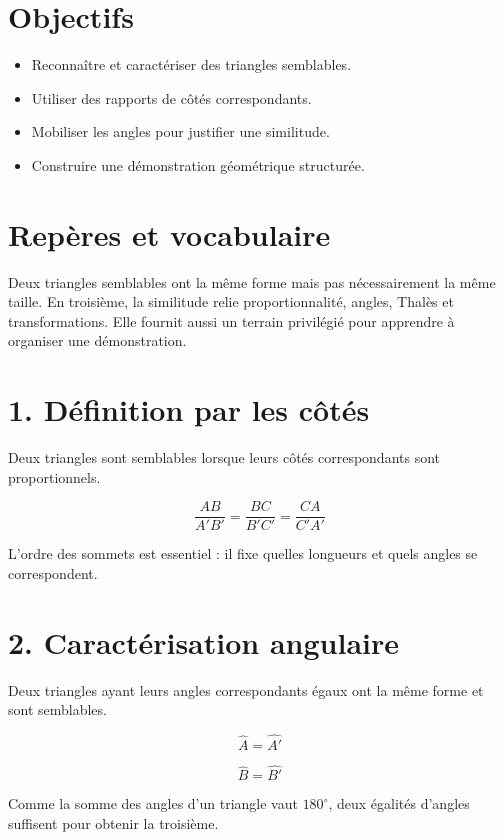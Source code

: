 
\section{Objectifs}
\begin{itemize}
\item Reconnaître et caractériser des triangles semblables.
\item Utiliser des rapports de côtés correspondants.
\item Mobiliser les angles pour justifier une similitude.
\item Construire une démonstration géométrique structurée.
\end{itemize}

\section{Repères et vocabulaire}
Deux triangles semblables ont la même forme mais pas nécessairement la même taille. En troisième, la similitude relie proportionnalité, angles, Thalès et transformations. Elle fournit aussi un terrain privilégié pour apprendre à organiser une démonstration.

\section{1. Définition par les côtés}
Deux triangles sont semblables lorsque leurs côtés correspondants sont proportionnels.

\[
\dfrac{AB}{A'B'}=\dfrac{BC}{B'C'}=\dfrac{CA}{C'A'}
\]

\begin{exemple}
L’ordre des sommets est essentiel : il fixe quelles longueurs et quels angles se correspondent.
\end{exemple}

\section{2. Caractérisation angulaire}
Deux triangles ayant leurs angles correspondants égaux ont la même forme et sont semblables.

\[
\widehat A=\widehat{A'}
\]

\[
\widehat B=\widehat{B'}
\]

\begin{exemple}
Comme la somme des angles d’un triangle vaut $180^\circ$, deux égalités d’angles suffisent pour obtenir la troisième.
\end{exemple}

